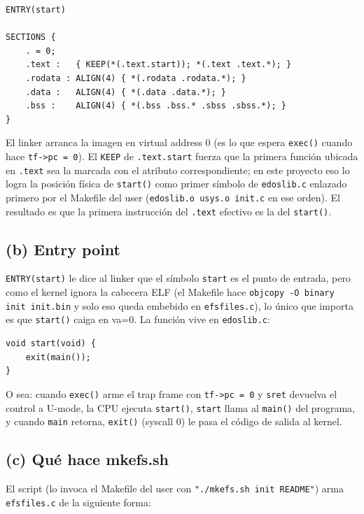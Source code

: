 \documentclass[11pt,a4paper]{article}
\begin{document}
\begin{lstlisting}[style=cstyle]
ENTRY(start)

SECTIONS {
    . = 0;
    .text :   { KEEP(*(.text.start)); *(.text .text.*); }
    .rodata : ALIGN(4) { *(.rodata .rodata.*); }
    .data :   ALIGN(4) { *(.data .data.*); }
    .bss :    ALIGN(4) { *(.bss .bss.* .sbss .sbss.*); }
}
\end{lstlisting}

El linker arranca la imagen en virtual address 0 (es lo que espera
\texttt{exec()} cuando hace \texttt{tf->pc = 0}). El \texttt{KEEP} de
\texttt{.text.start} fuerza que la primera función ubicada en \texttt{.text} sea
la marcada con el atributo correspondiente; en este proyecto eso lo logra la
posición física de \texttt{start()} como primer símbolo de \texttt{edoslib.c}
enlazado primero por el Makefile del user (\texttt{edoslib.o usys.o init.c} en
ese orden). El resultado es que la primera instrucción del \texttt{.text}
efectivo es la del \texttt{start()}.

\subsection*{(b) Entry point}

\texttt{ENTRY(start)} le dice al linker que el símbolo \texttt{start} es el punto
de entrada, pero como el kernel ignora la cabecera ELF (el Makefile hace
\texttt{objcopy -O binary init init.bin} y solo eso queda embebido en
\texttt{efsfiles.c}), lo único que importa es que \texttt{start()} caiga en va=0.
La función vive en \texttt{edoslib.c}:

\begin{lstlisting}[style=cstyle]
void start(void) {
    exit(main());
}
\end{lstlisting}

O sea: cuando \texttt{exec()} arme el trap frame con \texttt{tf->pc = 0} y
\texttt{sret} devuelva el control a U-mode, la CPU ejecuta \texttt{start()},
\texttt{start} llama al \texttt{main()} del programa, y cuando \texttt{main}
retorna, \texttt{exit()} (syscall 0) le pasa el código de salida al kernel.

\subsection*{(c) Qué hace mkefs.sh}

El script (lo invoca el Makefile del user con \texttt{"./mkefs.sh init README"})
arma \texttt{efsfiles.c} de la siguiente forma:
\end{document}
